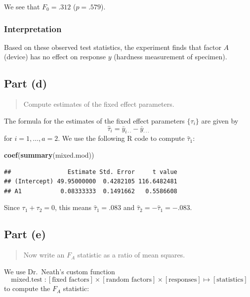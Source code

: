 \documentclass[
]{article}
\newenvironment{Shaded}{\begin{snugshade}}{\end{snugshade}}
\newcommand{\FunctionTok}[1]{\textcolor[rgb]{0.13,0.29,0.53}{\textbf{#1}}}
\newcommand{\NormalTok}[1]{#1}
\begin{document}
We see that \(F_0 = .312\) (\(p = .579\)).

\hypertarget{interpretation}{%
\subsubsection{Interpretation}\label{interpretation}}

Based on these observed test statistics, the experiment finds that
factor \(A\) (device) has no effect on response \(y\) (hardness
measurement of specimen).

\hypertarget{part-d}{%
\subsection{Part (d)}\label{part-d}}

\begin{quote}
Compute estimates of the fixed effect parameters.
\end{quote}

The formula for the estimates of the fixed effect parameters
\(\{\tau_i\}\) are given by \[
  \hat{\tau}_i = \bar{y}_{i \cdot\cdot} - \bar{y}_{\cdot\cdot\cdot}
\] for \(i=1,\ldots,a=2\). We use the following R code to compute
\(\hat{\tau}_1\):

\begin{Shaded}
\begin{Highlighting}[]
\FunctionTok{coef}\NormalTok{(}\FunctionTok{summary}\NormalTok{(mixed.mod))}
\end{Highlighting}
\end{Shaded}

\begin{verbatim}
##                Estimate Std. Error     t value
## (Intercept) 49.95000000  0.4282105 116.6482481
## A1           0.08333333  0.1491662   0.5586608
\end{verbatim}

Since \(\tau_1 + \tau_2 = 0\), this means \(\hat{\tau}_1 = .083\) and
\(\hat{\tau}_2 = -\hat{\tau}_1 = -.083\).

\hypertarget{part-e}{%
\subsection{Part (e)}\label{part-e}}

\begin{quote}
Now write an \(F_A\) statistic as a ratio of mean squares.
\end{quote}

We use Dr.~Neath's custom function \[
  \operatorname{mixed.test} : [\text{fixed factors}] \times
    [\text{random factors}] \times [\text{responses}] \mapsto
    [\text{statistics}]
\] to compute the \(F_A\) statistic:
\end{document}
